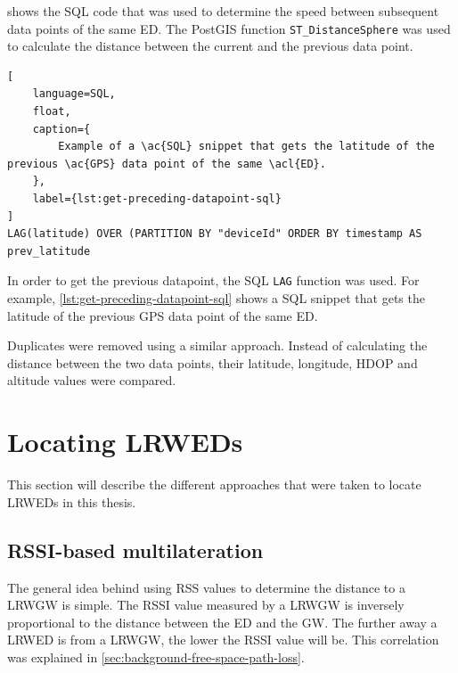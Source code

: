  shows the \ac{SQL} code that was used to determine the speed between subsequent data points of the same \acl{ED}.
The PostGIS function \lstinline|ST_DistanceSphere| was used to calculate the distance between the current and the previous data point.

\begin{lstlisting}[
    language=SQL,
    float,
    caption={
        Example of a \ac{SQL} snippet that gets the latitude of the previous \ac{GPS} data point of the same \acl{ED}.
    },
    label={lst:get-preceding-datapoint-sql}
]
LAG(latitude) OVER (PARTITION BY "deviceId" ORDER BY timestamp AS prev_latitude
\end{lstlisting}

In order to get the previous datapoint, the SQL \lstinline|LAG| function was used.
For example, \cref{lst:get-preceding-datapoint-sql} shows a \ac{SQL} snippet that gets the latitude of the previous \ac{GPS} data point of the same \acl{ED}.

Duplicates were removed using a similar approach.
Instead of calculating the distance between the two data points, their latitude, longitude, \ac{HDOP} and altitude values were compared.

\section{Locating \aclp{LRWED}}

This section will describe the different approaches that were taken to locate \aclp{LRWED} in this thesis.

\subsection{\acs{RSSI}-based multilateration}\label{sec:rssi-based-multilateration-implementation}

The general idea behind using \ac{RSS} values to determine the distance to a \acl{LRWGW} is simple.
The \ac{RSSI} value measured by a \acl{LRWGW} is inversely proportional to the distance between the \acl{ED} and the \acl{GW}.
The further away a \acl{LRWED} is from a \acl{LRWGW}, the lower the \ac{RSSI} value will be.
This correlation was explained in \cref{sec:background-free-space-path-loss}.


